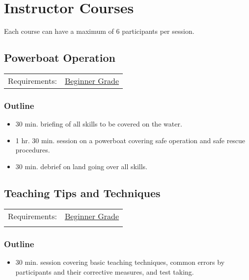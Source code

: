 \documentclass[12pt]{scrartcl}
\begin{document}
\newpage

\section{Instructor Courses} \label{sec:instructor courses}

Each course can have a maximum of 6 participants per session.

\subsection{Powerboat Operation} \label{subsec:powerboat operation}

\label{tab:powerboat operation:requirements}
\begin{tabular}{ll}
	Requirements: & \hyperlink{grade:beginner}{Beginner Grade} \\
\end{tabular}

\subsubsection{Outline} \label{subsubsec:powerboat operation:outline}

\begin{itemize}
	\item 30 min. briefing of all skills to be covered on the water.
	\item 1 hr. 30 min. session on a powerboat covering safe operation and safe rescue procedures.
	\item 30 min. debrief on land going over all skills.
\end{itemize}

\subsection{Teaching Tips and Techniques} \label{subsec:teaching tips and techniques}

\label{tab:teaching tips and techniques:requirements}
\begin{tabular}{ll}
	Requirements: & \hyperlink{grade:beginner}{Beginner Grade} \\
	& \nameref{subsec:powerboat operation} \\
\end{tabular}

\subsubsection{Outline} \label{subsubsec:teaching tips and techniques:outline}

\begin{itemize}
	\item 30 min. session covering basic teaching techniques, common errors by participants and their corrective measures, and test taking.
\end{itemize}
\end{document}
